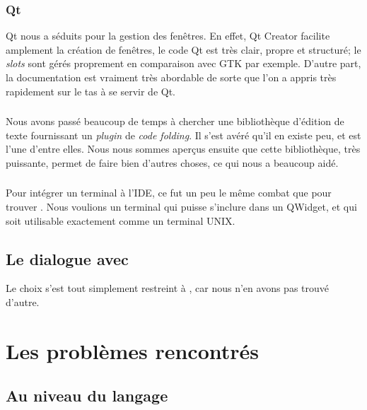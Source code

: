         \subsubsection{Qt}
        
            Qt nous a séduits pour la gestion des fenêtres.
			En effet, Qt Creator facilite amplement la création de fenêtres, le code Qt est très clair, propre et structuré; le \emph{slots} sont gérés proprement en comparaison avec GTK par exemple.
			D'autre part, la documentation est vraiment très abordable de sorte que l'on a appris très rapidement sur le tas à se servir de Qt.
			
		\subsubsection{\qcodeedit{}}
			
			Nous avons passé beaucoup de temps à chercher une bibliothèque d'édition de texte fournissant un \emph{plugin} de \emph{code folding}.
			Il s'est avéré qu'il en existe peu, et \qcodeedit{} est l'une d'entre elles.
			Nous nous sommes aperçus ensuite que cette bibliothèque, très puissante, permet de faire bien d'autres choses, ce qui nous a beaucoup aidé. %
			
		\subsubsection{\qtermwidget{}}
			
			Pour intégrer un terminal à l'IDE, ce fut un peu le même combat que pour trouver \qcodeedit{}.
			Nous voulions un terminal qui puisse s'inclure dans un QWidget, et qui soit utilisable exactement comme un terminal UNIX.
		
    \subsection{Le dialogue avec \coq{}}
    
		Le choix s'est tout simplement restreint à \coqtop{}, car nous n'en avons pas trouvé d'autre.
        
\section{Les problèmes rencontrés}

    \subsection{Au niveau du langage}
    
